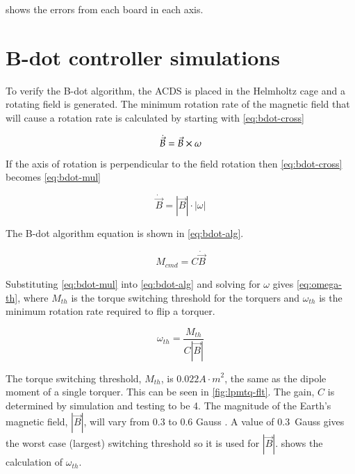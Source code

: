  shows the errors from each board in each axis.

\section{B-dot controller simulations}

To verify the B-dot algorithm, the \ac{ACDS} is placed in the Helmholtz cage and a rotating field is generated. The minimum rotation rate of the magnetic field that will cause a rotation rate is calculated by starting with \cref{eq:bdot-cross}

\begin{equation}
    \dot{\vec{B}} = \vec{B} \times \omega
    \label{eq:bdot-cross}
\end{equation}

If the axis of rotation is perpendicular to the field rotation then \cref{eq:bdot-cross} becomes \cref{eq:bdot-mul}

\begin{equation}
    \dot{\vec{B}} = \left| \vec{B} \right| \cdot \left| \omega \right|
    \label{eq:bdot-mul}
\end{equation}

The B-dot algorithm equation is shown in \cref{eq:bdot-alg}.

\begin{equation}
    M_{cmd} = C \dot{\vec{B}} 
    \label{eq:bdot-alg}
\end{equation}

Substituting \cref{eq:bdot-mul} into \cref{eq:bdot-alg} and solving for $\omega$ gives \cref{eq:omega-th}, where $M_{th}$ is the torque switching threshold for the torquers and $\omega_{th}$ is the minimum rotation rate required to flip a torquer.


\begin{equation}
    \omega _ {th} = \frac{M _ {th}}{C \left| \vec{B} \right|}
    \label{eq:omega-th}
\end{equation}

The torque switching threshold, $M_{th}$, is $0.022 \unit{A \cdot m} ^2$, the same as the dipole moment of a single torquer. This can be seen in \cref{fig:lpmtq-flt}. The gain, $C$ is determined by simulation and testing to be 4. The magnitude of the Earth's magnetic field, ${\left| \vec{B} \right|}$, will vary from 0.3 to 0.6 Gauss \cite[pp.~114]{Wertz}. A value of 0.3~Gauss gives the worst case (largest) switching threshold so it is used for ${\left| \vec{B} \right|}$.  shows the calculation of $\omega_{th}$.

